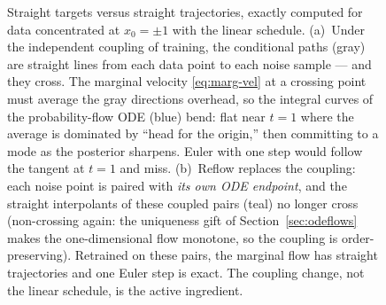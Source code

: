 \documentclass[10pt,a4paper]{article}
\begin{document}
\begin{figure}[t]
\centering
{}\hfill
{}
\caption{Straight targets versus straight trajectories, exactly computed
for data concentrated at $x_0 = \pm 1$ with the linear schedule. (a)~Under
the independent coupling of training, the conditional paths (gray) are
straight lines from each data point to each noise sample --- and they
cross. The marginal velocity \eqref{eq:marg-vel} at a crossing point must
average the gray directions overhead, so the integral curves of the
probability-flow ODE (blue) bend: flat near $t = 1$ where the average is
dominated by ``head for the origin,'' then committing to a mode as the
posterior sharpens. Euler with one step would follow the tangent at
$t = 1$ and miss. (b)~Reflow replaces the coupling: each noise point is
paired with \emph{its own ODE endpoint}, and the straight interpolants of
these coupled pairs (teal) no longer cross (non-crossing again: the
uniqueness gift of Section~\ref{sec:odeflows} makes the one-dimensional
flow monotone, so the coupling is order-preserving). Retrained on these
pairs, the marginal flow has straight
trajectories and one Euler step is exact. The coupling change, not the
linear schedule, is the active ingredient.}
\label{fig:reflow}
\end{figure}
\end{document}
